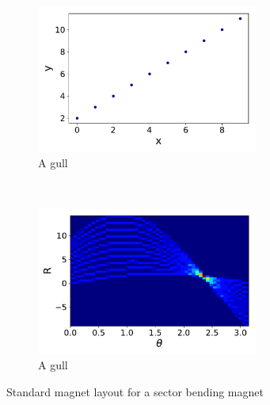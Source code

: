\documentclass{cernatsnote}
\begin{document}
\begin{figure}[ht]
	\centering
	\begin{subfigure}[b]{0.5\textwidth}
        \includegraphics[width=0.8\textwidth]{figures/line.pdf}
        \caption{A gull}
    \end{subfigure}
		~ %
		\begin{subfigure}[b]{0.5\textwidth}
					\includegraphics[width=0.8\textwidth]{figures/line_hough.pdf}
					\caption{A gull}
			\end{subfigure}
\caption{\label{fig:StandardMagnetLayout} Standard magnet layout for a sector bending magnet}
\end{figure}




\end{document}
